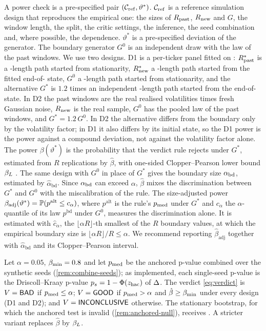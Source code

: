\begin{definition}\label{def:power-check}
A power check is a pre-specified pair $(\mathcal{C}_{\mathrm{ref}},\vartheta^*)$. $\mathcal{C}_{\mathrm{ref}}$ is a reference
simulation design that reproduces the empirical one: the sizes of $R_{\mathrm{past}}$, $R_{\mathrm{new}}$ and $G$, the
window length, the split, the critic settings, the inference, the seed combination and, where
possible, the dependence. $\vartheta^*$ is a pre-specified deviation of the generator. The
boundary generator $G^0$ is an independent draw with the law of the past windows. We use two
designs. D1 is a per-ticker \GARCHt{} panel fitted on \TRAIN: $R_{\mathrm{past}}^*$ is a \TRAIN-length path
started from stationarity, $R_{\mathrm{new}}^*$ a \TEST-length path started from the fitted end-of-\TRAIN{}
state, $G^0$ a \TEST-length path started from stationarity, and the alternative $G^*$ is $1.2$
times an independent \TEST-length path started from the end-of-\TRAIN{} state. In D2 the past
windows are the real \TRAIN{} realised volatilities times fresh Gaussian noise, $R_{\mathrm{new}}$ is the
real \TEST{} sample, $G^0$ has the pooled law of the past windows, and $G^*=1.2\,G^0$. In D2 the
alternative differs from the boundary only by the volatility factor; in D1 it also differs by its
initial state, so the D1 power is the power against a compound deviation, not against the
volatility factor alone. The power $\beta(\vartheta^*)$ is the probability that the verdict rule
rejects under $G^*$, estimated from $R$ replications by $\hat\beta$, with one-sided
Clopper--Pearson lower bound $\beta_{L}$ \citep{clopper_1934_use}. The same design with $G^0$ in place
of $G^*$ gives the boundary size $\alpha_{\mathrm{bd}}$, estimated by $\hat\alpha_{\mathrm{bd}}$. Since $\alpha_{\mathrm{bd}}$ can
exceed $\alpha$, $\hat\beta$ mixes the discrimination between $G^*$ and $G^0$ with the
miscalibration of the rule.
The size-adjusted power $\beta_{\mathrm{adj}}(\vartheta^*)=\mathbb{P}(p^{\mathrm{alt}}\le c_\alpha)$,
where $p^{\mathrm{alt}}$ is the rule's $p_{\mathrm{med}}$ under $G^*$ and $c_\alpha$ the $\alpha$-quantile of
its law $p^{\mathrm{bd}}$ under $G^0$, measures the discrimination alone. It is estimated with
$\hat c_\alpha$, the $\lfloor\alpha R\rfloor$-th smallest of the $R$ boundary values, at which the
empirical boundary size is $\lfloor\alpha R\rfloor/R\le\alpha$. We recommend reporting
$\hat\beta_{\mathrm{adj}}$ together with $\hat\alpha_{\mathrm{bd}}$ and its Clopper--Pearson
interval.
\end{definition}

\begin{definition}[Verdict]\label{def:verdict}
Let $\alpha=0.05$, $\beta_{\min}=0.8$ and let $p_{\mathrm{med}}$ be the anchored p-value combined over the synthetic
seeds (\cref{rem:combine-seeds}); as implemented, each single-seed p-value is the Driscoll--Kraay
p-value $p_s=1-\Phi(z_{\mathrm{hac}})$ of $\Delta$. The verdict \eqref{eq:verdict} is $V=\textsf{BAD}$ if
$p_{\mathrm{med}}\le\alpha$; $V=\textsf{GOOD}$ if $p_{\mathrm{med}}>\alpha$ and $\hat\beta\ge\beta_{\min}$ under every design (D1 and D2); and
$V=\textsf{INCONCLUSIVE}$ otherwise. The stationary bootstrap, for which the anchored test is invalid
(\cref{rem:anchored-null}), receives \INVALID. A stricter variant replaces $\hat\beta$ by $\beta_{L}$.
\end{definition}

